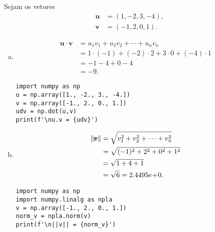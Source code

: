\begin{ex}
  Sejam os vetores
  \begin{align}
    \pmb{u} &= (1, -2, 3, -4),\\
    \pmb{v} &= (-1, 2, 0, 1).
  \end{align}
  \begin{enumerate}[a)]
  \item
    \begin{align}
      \pmb{u}\cdot\pmb{v} &= u_1v_1 + u_2v_2 + \cdots + u_nv_n\\
                          &= 1\cdot(-1) + (-2)\cdot 2 + 3\cdot 0 + (-4)\cdot 1\\
                          &= -1 - 4 + 0 - 4\\
                          &= -9.
    \end{align}

\begin{lstlisting}
import numpy as np
u = np.array([1., -2., 3., -4.])
v = np.array([-1., 2., 0., 1.])
udv = np.dot(u,v)
print(f'\nu.v = {udv}')
\end{lstlisting}

  \item
    \begin{align}
      \|\pmb{v}\| &= \sqrt{v_1^2 + v_2^2 + \cdots + v_n^2}\\
                  &= \sqrt{(-1)^2 + 2^2 + 0^2 + 1^2}\\
                  &= \sqrt{1 + 4 + 1}\\
                  &= \sqrt{6} = 2.4495\mathrm{e}\!+\!0.
    \end{align}

\begin{lstlisting}
import numpy as np
import numpy.linalg as npla
v = np.array([-1., 2., 0., 1.])
norm_v = npla.norm(v)
print(f'\n||v|| = {norm_v}')
\end{lstlisting}

  \end{enumerate}
\end{ex}


